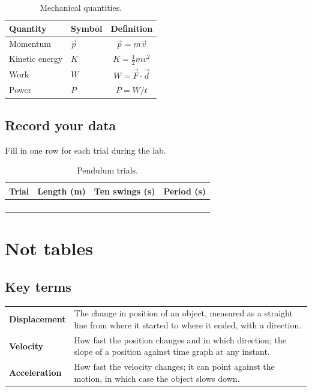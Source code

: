 \documentclass[11pt]{article}
\begin{document}
\begin{table}[h]
\centering
\caption{Mechanical quantities.}
\renewcommand{\arraystretch}{1.6}
\begin{tabular}{llc}
\toprule
Quantity & Symbol & Definition \\
\midrule
Momentum & $\vec{p}$ & $\vec{p} = m\vec{v}$ \\
Kinetic energy & $K$ & $K = \tfrac{1}{2}mv^2$ \\
Work & $W$ & $W = \vec{F}\cdot\vec{d}$ \\
Power & $P$ & $P = W/t$ \\
\bottomrule
\end{tabular}
\end{table}

\subsection{Record your data}

Fill in one row for each trial during the lab.

\begin{table}[h]
\centering
\caption{Pendulum trials.}
\renewcommand{\arraystretch}{1.8}
\begin{tabular}{|p{2cm}|p{3cm}|p{3cm}|p{3cm}|}
\hline
Trial & Length (m) & Ten swings (s) & Period (s) \\
\hline
 & & & \\
\hline
 & & & \\
\hline
 & & & \\
\hline
 & & & \\
\hline
\end{tabular}
\end{table}

\clearpage
\section{Not tables}
\subsection{Key terms}

\noindent
\begin{tabular}{@{}p{3cm}p{11cm}@{}}
\textbf{Displacement} & The change in position of an object, measured as a straight line from where it started to where it ended, with a direction. \\[6pt]
\textbf{Velocity} & How fast the position changes and in which direction; the slope of a position against time graph at any instant. \\[6pt]
\textbf{Acceleration} & How fast the velocity changes; it can point against the motion, in which case the object slows down. \\
\end{tabular}
\end{document}
